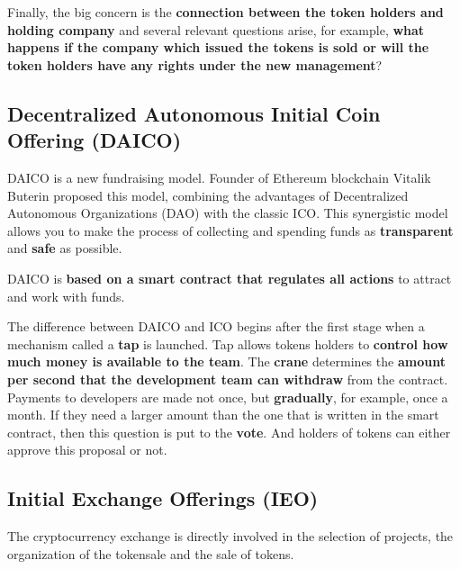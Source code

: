 Finally, the big concern is the \textbf{connection between the token holders and holding company} and several relevant questions arise, for example, \textbf{what happens if the company which issued the tokens is sold or will the token holders have any rights under the new management}?

\subsection{Decentralized Autonomous Initial Coin Offering (DAICO)}

DAICO is a new fundraising model. Founder of Ethereum blockchain Vitalik Buterin proposed this model, combining the advantages of Decentralized Autonomous Organizations (DAO) with the classic ICO. This synergistic model allows you to make the process of collecting and spending funds as \textbf{transparent} and \textbf{safe} as possible.

DAICO is \textbf{based on a smart contract that regulates all actions} to attract and work with funds.

The difference between DAICO and ICO begins after the first stage when a mechanism called a \textbf{tap} is launched. Tap allows tokens holders to \textbf{control how much money is available to the team}. The \textbf{crane} determines the \textbf{amount per second that the development team can withdraw} from the contract. Payments to developers are made not once, but \textbf{gradually}, for example, once a month. If they need a larger amount than the one that is written in the smart contract, then this question is put to the \textbf{vote}. And holders of tokens can either approve this proposal or not.

\subsection{Initial Exchange Offerings (IEO)}

The cryptocurrency exchange is directly involved in the selection of projects, the organization of the tokensale and the sale of tokens.

